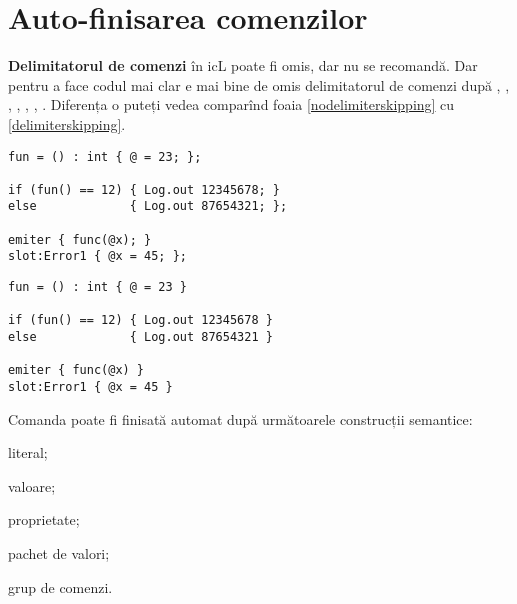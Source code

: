 \section{Auto-finisarea comenzilor}

\textbf{Delimitatorul de comenzi} în icL poate fi omis, dar nu se recomandă. Dar pentru a face codul mai clar e mai bine de omis delimitatorul de comenzi după , , , , , , . Diferența o puteți vedea comparînd foaia \ref{nodelimiterskipping} cu  \ref{delimiterskipping}.

\begin{lstlisting}[caption=Făra delimitatori omiși, label=nodelimiterskipping]
fun = () : int { @ = 23; };

if (fun() == 12) { Log.out 12345678; } 
else             { Log.out 87654321; };

emiter { func(@x); }
slot:Error1 { @x = 45; };
\end{lstlisting}

\begin{lstlisting}[caption=Cu delimitatori omiși, label=delimiterskipping]
fun = () : int { @ = 23 }

if (fun() == 12) { Log.out 12345678 } 
else             { Log.out 87654321 }

emiter { func(@x) }
slot:Error1 { @x = 45 }
\end{lstlisting}

Comanda poate fi finisată automat după următoarele construcții semantice:
\begin{icItems}
	\item literal;
	\item valoare;
	\item proprietate;
	\item pachet de valori;
	\item grup de comenzi.
\end{icItems}
